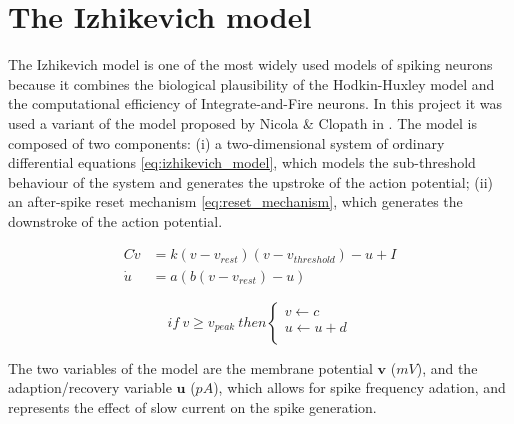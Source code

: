 \documentclass[10pt,a4paper, final]{report} %
\begin{document}
\section{The Izhikevich model}
\label{sec:izhikevich_model}
The Izhikevich model \cite{izhikevich2003simple} is one of the most widely used models of spiking neurons because it combines the biological plausibility of the Hodkin-Huxley model and the computational efficiency of Integrate-and-Fire neurons. In this project it was used a variant of the model proposed by Nicola \& Clopath in \cite{nicola2017supervised}.
The model is composed of two components: (i) a two-dimensional system of ordinary differential equations \eqref{eq:izhikevich_model}, which models the sub-threshold behaviour of the system and generates the upstroke of the action potential; (ii) an after-spike reset mechanism \eqref{eq:reset_mechanism}, which generates the downstroke of the action potential.

\begin{subequations}
\label{eq:izhikevich_model}
\begin{align}
C \dot v &=  k(v - v_{rest}) (v - v_{threshold}) - u + I \label{eq:izikevich_membrane}\\
\dot u &= a(b(v - v_{rest}) - u)
\end{align}
\end{subequations}

\begin{equation}
if\ v \geq v_{peak}\ then
\begin{cases}
v \leftarrow c \\
u \leftarrow u + d\\
\end{cases}
\label{eq:reset_mechanism}
\end{equation}

The two variables of the model are the membrane potential $\bm{v}$ ($mV$), and the adaption/recovery variable $\bm{u}$ ($pA$), which allows for spike frequency adation, and represents the effect of slow current on the spike generation.
\end{document}
